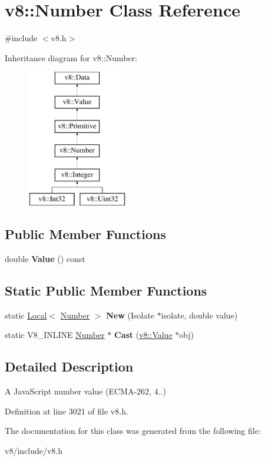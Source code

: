 \hypertarget{classv8_1_1Number}{}\section{v8\+:\+:Number Class Reference}
\label{classv8_1_1Number}


{\ttfamily \#include $<$v8.\+h$>$}

Inheritance diagram for v8\+:\+:Number\+:\begin{figure}[H]
\begin{center}
\leavevmode
\includegraphics[height=6.000000cm]{classv8_1_1Number}
\end{center}
\end{figure}
\subsection*{Public Member Functions}
\begin{DoxyCompactItemize}
\item 
\mbox{\label{classv8_1_1Number_aed515db835eefc10820d45c60775e950}} 
double {\bfseries Value} () const
\end{DoxyCompactItemize}
\subsection*{Static Public Member Functions}
\begin{DoxyCompactItemize}
\item 
\mbox{\label{classv8_1_1Number_a90ea55018560648ffaf8861372b41928}} 
static \mbox{\hyperlink{classv8_1_1Local}{Local}}$<$ \mbox{\hyperlink{classv8_1_1Number}{Number}} $>$ {\bfseries New} (Isolate $\ast$isolate, double value)
\item 
\mbox{\label{classv8_1_1Number_a053d48e0003104308963a4a7e3881912}} 
static V8\+\_\+\+I\+N\+L\+I\+NE \mbox{\hyperlink{classv8_1_1Number}{Number}} $\ast$ {\bfseries Cast} (\mbox{\hyperlink{classv8_1_1Value}{v8\+::\+Value}} $\ast$obj)
\end{DoxyCompactItemize}


\subsection{Detailed Description}
A Java\+Script number value (E\+C\+M\+A-\/262, 4..) 

Definition at line 3021 of file v8.\+h.



The documentation for this class was generated from the following file\+:\begin{DoxyCompactItemize}
\item 
v8/include/v8.\+h\end{DoxyCompactItemize}
